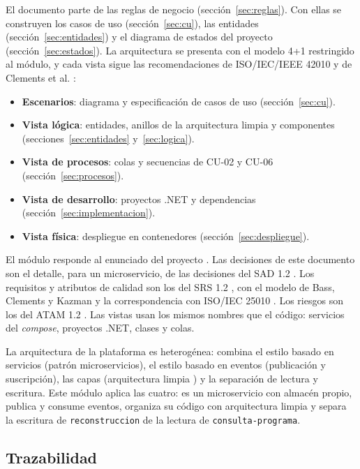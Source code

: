 \documentclass[11pt,a4paper]{article}
\begin{document}
El documento parte de las reglas de negocio (sección~\ref{sec:reglas}). Con ellas se construyen los casos de uso
(sección~\ref{sec:cu}), las entidades (sección~\ref{sec:entidades}) y el diagrama de estados del proyecto
(sección~\ref{sec:estados}). La arquitectura se presenta con el modelo 4+1 \cite{kruchten} restringido
al módulo, y cada vista sigue las recomendaciones de ISO/IEC/IEEE 42010 \cite{iso42010} y de Clements et
al. \cite{clements}:

\begin{itemize}
  \item \textbf{Escenarios}: diagrama y especificación de casos de uso (sección~\ref{sec:cu}).
  \item \textbf{Vista lógica}: entidades, anillos de la arquitectura limpia y componentes
        (secciones~\ref{sec:entidades} y~\ref{sec:logica}).
  \item \textbf{Vista de procesos}: colas y secuencias de CU-02 y CU-06 (sección~\ref{sec:procesos}).
  \item \textbf{Vista de desarrollo}: proyectos .NET y dependencias (sección~\ref{sec:implementacion}).
  \item \textbf{Vista física}: despliegue en contenedores (sección~\ref{sec:despliegue}).
\end{itemize}

El módulo responde al enunciado del proyecto \cite{enunciado}. Las decisiones de este documento son el detalle,
para un microservicio, de las decisiones del SAD 1.2 \cite{sad}. Los requisitos y atributos de calidad son los del
SRS 1.2 \cite{srs}, con el modelo de Bass, Clements y Kazman \cite{bass} y la correspondencia con ISO/IEC 25010
\cite{iso25010}. Los riesgos son los del ATAM 1.2 \cite{atam}. Las vistas usan los mismos nombres que el código:
servicios del \emph{compose}, proyectos .NET, clases y colas.

La arquitectura de la plataforma es heterogénea: combina el estilo basado en servicios (patrón microservicios), el
estilo basado en eventos (publicación y suscripción), las capas (arquitectura limpia \cite{martin}) y la separación de
lectura y escritura. Este módulo aplica las cuatro: es un microservicio con almacén propio, publica y consume eventos,
organiza su código con arquitectura limpia y separa la escritura de \texttt{reconstruccion} de la lectura de
\texttt{consulta-programa}.

\subsection{Trazabilidad}
\end{document}
